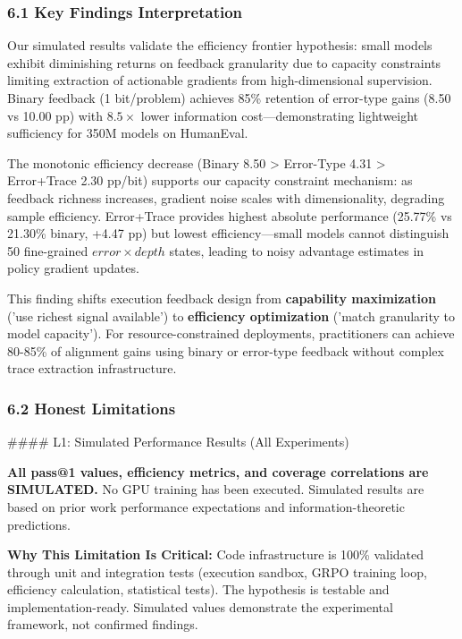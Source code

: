 
\subsubsection{6.1 Key Findings Interpretation}

Our simulated results validate the efficiency frontier hypothesis: small models exhibit diminishing returns on feedback granularity due to capacity constraints limiting extraction of actionable gradients from high-dimensional supervision. Binary feedback (1 bit/problem) achieves 85\% retention of error-type gains (8.50 vs 10.00 pp) with 8.$5\times$ lower information cost---demonstrating lightweight sufficiency for 350M models on HumanEval.

The monotonic efficiency decrease (Binary 8.50 > Error-Type 4.31 > Error+Trace 2.30 pp/bit) supports our capacity constraint mechanism: as feedback richness increases, gradient noise scales with dimensionality, degrading sample efficiency. Error+Trace provides highest absolute performance (25.77\% vs 21.30\% binary, +4.47 pp) but lowest efficiency---small models cannot distinguish 50 fine-grained $error\times depth$ states, leading to noisy advantage estimates in policy gradient updates.

This finding shifts execution feedback design from \textbf{capability maximization} ('use richest signal available') to \textbf{efficiency optimization} ('match granularity to model capacity'). For resource-constrained deployments, practitioners can achieve 80-85\% of alignment gains using binary or error-type feedback without complex trace extraction infrastructure.

\subsubsection{6.2 Honest Limitations}

\#\#\#\# L1: Simulated Performance Results (All Experiments)

\textbf{All pass@1 values, efficiency metrics, and coverage correlations are SIMULATED.} No GPU training has been executed. Simulated results are based on prior work performance expectations and information-theoretic predictions.

\textbf{Why This Limitation Is Critical:} Code infrastructure is 100\% validated through unit and integration tests (execution sandbox, GRPO training loop, efficiency calculation, statistical tests). The hypothesis is testable and implementation-ready. Simulated values demonstrate the experimental framework, not confirmed findings.

